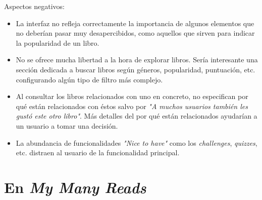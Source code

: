 Aspectos negativos:

\begin{itemize}
\item La interfaz no refleja correctamente la importancia de algunos elementos que no deberían pasar muy desapercibidos, como aquellos que sirven para indicar la popularidad de un libro.
\item No se ofrece mucha libertad a la hora de explorar libros. Sería interesante una sección dedicada a buscar libros según géneros, popularidad, puntuación, etc. configurando algún tipo de filtro más complejo.
\item Al consultar los libros relacionados con uno en concreto, no especifican por qué están relacionados con éstos salvo por \textit{"A muchos usuarios también les gustó este otro libro"}. Más detalles del por qué están relacionados ayudarían a un usuario a tomar una decisión.
\item La abundancia de funcionalidades \textit{"Nice to have"} como los \textit{challenges}, \textit{quizzes}, etc. distraen al usuario de la funcionalidad principal.
\end{itemize}

\section{En \textit{My Many Reads}}
